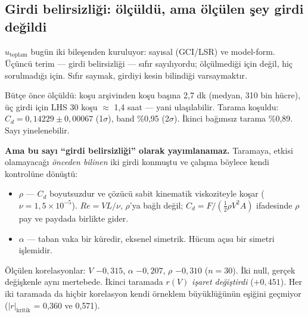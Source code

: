 \documentclass[11pt,a4paper]{article}
\begin{document}
\subsection{Girdi belirsizliği: ölçüldü, ama ölçülen şey girdi değildi}
\label{sub:girdi-uq}

$u_{\text{toplam}}$ bugün iki bileşenden kuruluyor: sayısal (GCI/LSR) ve
model-form. Üçüncü terim --- girdi belirsizliği --- sıfır sayılıyordu;
ölçülmediği için değil, hiç sorulmadığı için. Sıfır saymak, girdiyi kesin
bilindiği varsaymaktır.

Bütçe önce ölçüldü: koşu arşivinden koşu başına 2{,}7 dk (medyan, 310 bin
hücre), üç girdi için LHS 30 koşu $\approx$ 1{,}4 saat --- yani ulaşılabilir.
Tarama koşuldu: $C_d = 0{,}14229 \pm 0{,}00067$ (1$\sigma$), band \%0{,}95
(2$\sigma$). İkinci bağımsız tarama \%0{,}89. Sayı yinelenebilir.

\textbf{Ama bu sayı ``girdi belirsizliği'' olarak yayımlanamaz.} Taramaya,
etkisi olamayacağı \emph{önceden bilinen} iki girdi konmuştu ve çalışma böylece
kendi kontrolüne dönüştü:

\begin{itemize}\setlength\itemsep{1pt}
  \item $\rho$ --- $C_d$ boyutsuzdur ve çözücü sabit kinematik viskoziteyle
        koşar ($\nu = 1{,}5\times10^{-5}$). $Re = VL/\nu$, $\rho$'ya bağlı
        değil; $C_d = F/(\tfrac12\rho V^2 A)$ ifadesinde $\rho$ pay ve paydada
        birlikte gider.
  \item $\alpha$ --- taban vaka bir küredir, eksenel simetrik. Hücum açısı bir
        simetri işlemidir.
\end{itemize}

\noindent Ölçülen korelasyonlar: $V$ $-0{,}315$, $\alpha$ $-0{,}207$,
$\rho$ $-0{,}310$ ($n{=}30$). İki null, gerçek değişkenle aynı mertebede.
İkinci taramada $r(V)$ \emph{işaret değiştirdi} ($+0{,}451$). Her iki taramada
da hiçbir korelasyon kendi örneklem büyüklüğünün eşiğini geçmiyor
($|r|_{\text{kritik}}$ = 0{,}360 ve 0{,}571).
\end{document}
